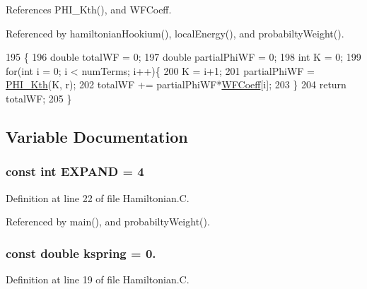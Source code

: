 References P\-H\-I\-\_\-\-Kth(), and W\-F\-Coeff.



Referenced by hamiltonian\-Hookium(), local\-Energy(), and probabilty\-Weight().


\begin{DoxyCode}
195                                                       \{
196     \textcolor{keywordtype}{double} totalWF = 0;
197     \textcolor{keywordtype}{double} partialPhiWF = 0;
198     \textcolor{keywordtype}{int} K  = 0;
199     \textcolor{keywordflow}{for}(\textcolor{keywordtype}{int} i = 0; i < numTerms; i++)\{
200         K = i+1;
201         partialPhiWF = \hyperlink{_hamiltonian_8_c_ae9b5889d7fdd0b64238fdb99de59325a}{PHI\_Kth}(K, r);
202         totalWF += partialPhiWF*\hyperlink{_hamiltonian_8_c_a9e3e25918df4dde4f87afaba7778d262}{WFCoeff}[i];
203     \}
204     \textcolor{keywordflow}{return} totalWF;
205 \}
\end{DoxyCode}


\subsection{Variable Documentation}
\hypertarget{_hamiltonian_8_c_aa718cdb1b8a3b134c27cd147b7048ba9}{
\subsubsection[{E\-X\-P\-A\-N\-D}]{\setlength{\rightskip}{0pt plus 5cm}const int E\-X\-P\-A\-N\-D = 4}}\label{_hamiltonian_8_c_aa718cdb1b8a3b134c27cd147b7048ba9}


Definition at line 22 of file Hamiltonian.\-C.



Referenced by main(), and probabilty\-Weight().

\hypertarget{_hamiltonian_8_c_a38ea2cbc62615007f27ca01aebdc04a8}{
\subsubsection[{kspring}]{\setlength{\rightskip}{0pt plus 5cm}const double kspring = 0.}}\label{_hamiltonian_8_c_a38ea2cbc62615007f27ca01aebdc04a8}


Definition at line 19 of file Hamiltonian.\-C.



